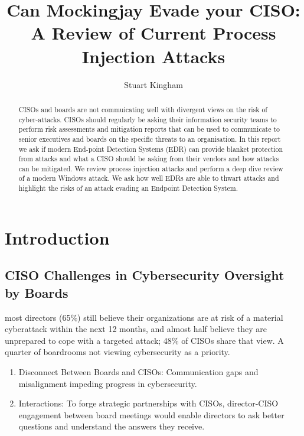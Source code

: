 \documentclass{article}
\title{Can Mockingjay Evade your CISO: A Review of Current Process Injection Attacks}
\author{Stuart Kingham}
\newcommand{\outlinecite}[1]{\citetitle{#1} \textcite{#1}}
\begin{document}
\maketitle

\begin{abstract}
  CISOs and boards are not commuicating well with divergent views on the risk of cyber-attacks.
  CISOs should regularly be asking their information security teams to perform risk assessments and mitigation reports that can be used to
  communicate to senior executives and boards on the specific threats to an organisation. 
  In this report we ask if modern End-point Detection Systems (EDR) can provide blanket protection from attacks and what a CISO should be asking from
  their vendors and how attacks can be mitigated.  We review process injection attacks and perform a deep dive review of a modern Windows attack.  We
  ask how well EDRs are able to thwart attacks and highlight the risks of an attack evading an Endpoint Detection System.
\end{abstract}

\newpage
\tableofcontents
{}

\newpage
\section{Introduction}


\outlinecite{Milica:2023}

\outlinecite{Hiscox:2022}


\subsection{CISO Challenges in Cybersecurity Oversight by Boards}

most directors (65\%) still believe their organizations are at risk of a material cyberattack within the next 12 months, and almost half believe they are unprepared to cope with a targeted attack;  48\% of CISOs share that view. A quarter of boardrooms not viewing cybersecurity as a priority.

\begin{enumerate}
\item Disconnect Between Boards and CISOs: Communication gaps and misalignment impeding progress in cybersecurity.
\item Interactions: To forge strategic partnerships with CISOs, director-CISO engagement between board meetings would enable directors to ask better questions and understand the answers they receive.
\end{enumerate}
\end{document}

